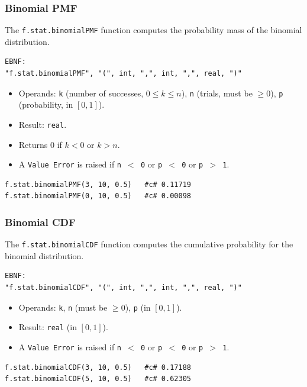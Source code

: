 \subsubsection{Binomial PMF}
The \texttt{f.stat.binomialPMF} function computes the probability mass of the binomial distribution.
\begin{verbatim}
EBNF:
"f.stat.binomialPMF", "(", int, ",", int, ",", real, ")"
\end{verbatim}
\begin{itemize}
\item Operands: \texttt{k} (number of successes, $0 \leq k \leq n$), \texttt{n} (trials, must be $\geq 0$), \texttt{p} (probability, in $[0, 1]$).
\item Result: \texttt{real}.
\item Returns 0 if $k < 0$ or $k > n$.
\item A \texttt{Value Error} is raised if \texttt{n $<$ 0} or \texttt{p $<$ 0} or \texttt{p $>$ 1}.
\end{itemize}
\begin{verbatim}
f.stat.binomialPMF(3, 10, 0.5)   #c# 0.11719
f.stat.binomialPMF(0, 10, 0.5)   #c# 0.00098
\end{verbatim}

\subsubsection{Binomial CDF}
The \texttt{f.stat.binomialCDF} function computes the cumulative probability for the binomial distribution.
\begin{verbatim}
EBNF:
"f.stat.binomialCDF", "(", int, ",", int, ",", real, ")"
\end{verbatim}
\begin{itemize}
\item Operands: \texttt{k}, \texttt{n} (must be $\geq 0$), \texttt{p} (in $[0, 1]$).
\item Result: \texttt{real} (in $[0, 1]$).
\item A \texttt{Value Error} is raised if \texttt{n $<$ 0} or \texttt{p $<$ 0} or \texttt{p $>$ 1}.
\end{itemize}
\begin{verbatim}
f.stat.binomialCDF(3, 10, 0.5)   #c# 0.17188
f.stat.binomialCDF(5, 10, 0.5)   #c# 0.62305
\end{verbatim}

